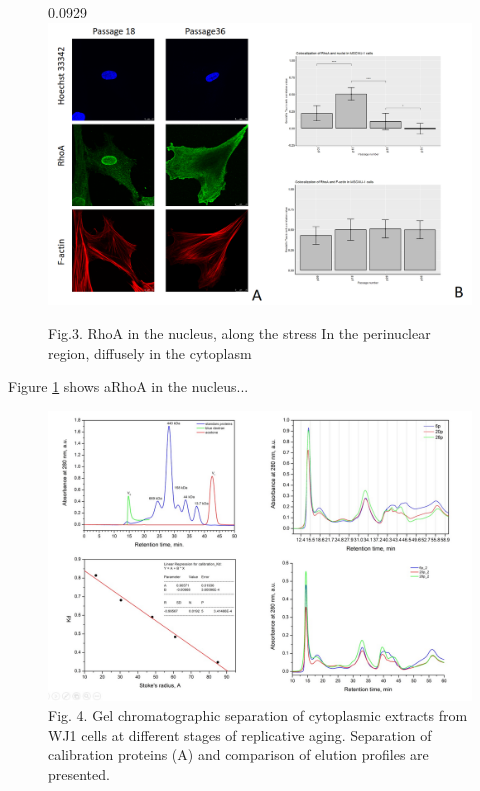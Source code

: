 \documentclass[a4paper,12pt]{article}
\begin{document}
\begin{figure}0.0929
  \includegraphics[width=0.8\linewidth]{fig3.png}
  \caption{Fig.3. RhoA in the nucleus, along the stress In the perinuclear region, diffusely in the cytoplasm}
  \label{fig:fig3}
  \centering
\end{figure}

Figure \ref{fig:fig3} shows aRhoA in the nucleus...

\begin{figure}[hbt!]
\centering
\includegraphics[width=0.8\linewidth]{fig4.jpg}
\caption{Fig. 4. Gel chromatographic separation of cytoplasmic extracts from WJ1 cells at different stages of replicative aging. Separation of calibration proteins (A) and comparison of elution profiles are presented.}
\label{fig:fig4}
\end{figure}
\end{document}
